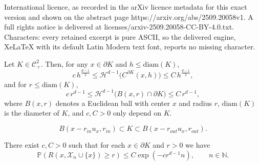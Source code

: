 \documentclass[10pt,a4paper]{amsart}
\def\P{{\mathds{P}}}
\def\bd{{\partial}}
\def\cC{{\mathcal C}}
\def\cH{{\mathcal H}}
\def\cX{{\mathcal X}}
\newcommand{\IN}{\mathds{N}}
\newcommand{\diam}{\mathrm{diam}}
\begin{document}
International licence, as recorded in the arXiv licence metadata for this exact version and shown on the abstract page https://arxiv.org/abs/2509.20058v1. A full rights notice is delivered at licenses/arxiv-2509.20058-CC-BY-4.0.txt. Characters: every retained excerpt is pure ASCII, so the delivered engine, XeLaTeX with its default Latin Modern text font, reports no missing character.
\begin{lemma}\label{lem:cap-convex}
Let $K\in \cC_+^2$. Then, for any $x\in \bd K$ and $h\le \diam(K)$, 
\[
c\, h^{\frac{d-1}{2}}
\le \cH^{d-1}\big(C^{\bd K}(x,h)\big)
\le C\, h^{\frac{d-1}{2}},
\]
and for $r\le \diam(K)$,
\begin{equation*} 
c \, r^{d-1}
\le \cH^{d-1}\big(B(x,r)\cap \bd K\big)
\le C\, r^{d-1},
\end{equation*}
where $B(x,r)$ denotes a Euclidean ball with center $x$ and radius $r$, $\diam(K)$ is the diameter of $K$, and $c,C>0$ only depend on $K$.
\end{lemma}

\begin{equation} \label{eq:in-out}
B(x-r_{in} u_x, r_{in}) 
\subset K
\subset B(x-r_{out} u_x, r_{out}).
\end{equation}

\begin{theorem}\label{th:rad_influence}
There exist $c,C>0$ such that for each $x \in \bd K$ and $r>0$ we have
$$
\P( R(x, \cX_{n} \cup\{x\}) \geq r)
\leq
C \exp(- c r^{d-1} n),\qquad n\in \IN. 
$$
\end{theorem}
\end{document}
